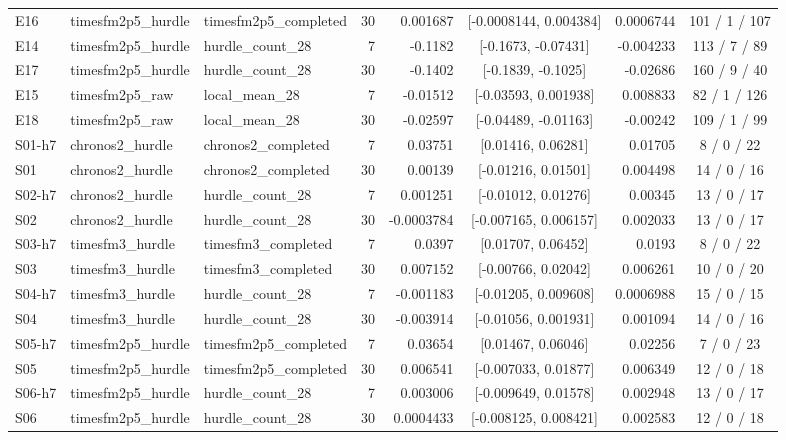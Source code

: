 \begin{table}[htbp]
\begin{tabular}{lllrrcrc}
E16 & timesfm2p5\_hurdle & timesfm2p5\_completed & 30 & 0.001687 & [-0.0008144, 0.004384] & 0.0006744 & 101 / 1 / 107 \\
E14 & timesfm2p5\_hurdle & hurdle\_count\_28 & 7 & -0.1182 & [-0.1673, -0.07431] & -0.004233 & 113 / 7 / 89 \\
E17 & timesfm2p5\_hurdle & hurdle\_count\_28 & 30 & -0.1402 & [-0.1839, -0.1025] & -0.02686 & 160 / 9 / 40 \\
E15 & timesfm2p5\_raw & local\_mean\_28 & 7 & -0.01512 & [-0.03593, 0.001938] & 0.008833 & 82 / 1 / 126 \\
E18 & timesfm2p5\_raw & local\_mean\_28 & 30 & -0.02597 & [-0.04489, -0.01163] & -0.00242 & 109 / 1 / 99 \\
\midrule
S01-h7 & chronos2\_hurdle & chronos2\_completed & 7 & 0.03751 & [0.01416, 0.06281] & 0.01705 & 8 / 0 / 22 \\
S01 & chronos2\_hurdle & chronos2\_completed & 30 & 0.00139 & [-0.01216, 0.01501] & 0.004498 & 14 / 0 / 16 \\
S02-h7 & chronos2\_hurdle & hurdle\_count\_28 & 7 & 0.001251 & [-0.01012, 0.01276] & 0.00345 & 13 / 0 / 17 \\
S02 & chronos2\_hurdle & hurdle\_count\_28 & 30 & -0.0003784 & [-0.007165, 0.006157] & 0.002033 & 13 / 0 / 17 \\
S03-h7 & timesfm3\_hurdle & timesfm3\_completed & 7 & 0.0397 & [0.01707, 0.06452] & 0.0193 & 8 / 0 / 22 \\
S03 & timesfm3\_hurdle & timesfm3\_completed & 30 & 0.007152 & [-0.00766, 0.02042] & 0.006261 & 10 / 0 / 20 \\
S04-h7 & timesfm3\_hurdle & hurdle\_count\_28 & 7 & -0.001183 & [-0.01205, 0.009608] & 0.0006988 & 15 / 0 / 15 \\
S04 & timesfm3\_hurdle & hurdle\_count\_28 & 30 & -0.003914 & [-0.01056, 0.001931] & 0.001094 & 14 / 0 / 16 \\
S05-h7 & timesfm2p5\_hurdle & timesfm2p5\_completed & 7 & 0.03654 & [0.01467, 0.06046] & 0.02256 & 7 / 0 / 23 \\
S05 & timesfm2p5\_hurdle & timesfm2p5\_completed & 30 & 0.006541 & [-0.007033, 0.01877] & 0.006349 & 12 / 0 / 18 \\
S06-h7 & timesfm2p5\_hurdle & hurdle\_count\_28 & 7 & 0.003006 & [-0.009649, 0.01578] & 0.002948 & 13 / 0 / 17 \\
S06 & timesfm2p5\_hurdle & hurdle\_count\_28 & 30 & 0.0004433 & [-0.008125, 0.008421] & 0.002583 & 12 / 0 / 18 \\
\bottomrule
\end{tabular}
\end{table}

